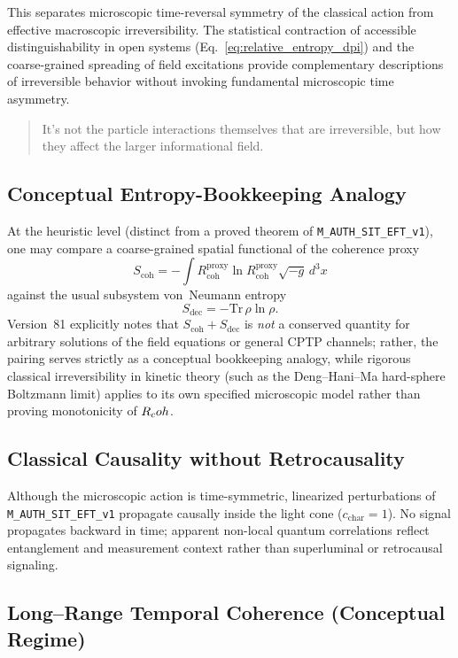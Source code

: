 This separates microscopic time-reversal symmetry of the classical action from effective macroscopic irreversibility. The statistical contraction of accessible distinguishability in open systems (Eq.~\eqref{eq:relative_entropy_dpi}) and the coarse-grained spreading of field excitations provide complementary descriptions of irreversible behavior without invoking fundamental microscopic time asymmetry.

\blockquote{
It's not the particle interactions themselves that are irreversible, but how they affect the larger informational field.
}

\subsection{Conceptual Entropy-Bookkeeping Analogy}

At the heuristic level (distinct from a proved theorem of \texttt{M\_AUTH\_SIT\_EFT\_v1}), one may compare a coarse-grained spatial functional of the coherence proxy
\[
S_{\mathrm{coh}} = -\int R_{\mathrm{coh}}^{\mathrm{proxy}}\ln R_{\mathrm{coh}}^{\mathrm{proxy}}\sqrt{-g}\,d^{3}x
\]
against the usual subsystem von~Neumann entropy
\[
S_{\mathrm{dec}} = -\mathrm{Tr}\,\rho\ln\rho.
\]
Version~81 explicitly notes that $S_{\mathrm{coh}} + S_{\mathrm{dec}}$ is \emph{not} a conserved quantity for arbitrary solutions of the field equations or general CPTP channels; rather, the pairing serves strictly as a conceptual bookkeeping analogy, while rigorous classical irreversibility in kinetic theory (such as the Deng--Hani--Ma hard-sphere Boltzmann limit) applies to its own specified microscopic model rather than proving monotonicity of $R_coh$.

\subsection{Classical Causality without Retrocausality}

Although the microscopic action is time-symmetric, linearized perturbations of \texttt{M\_AUTH\_SIT\_EFT\_v1} propagate causally inside the light cone ($c_{\mathrm{char}} = 1$). No signal propagates backward in time; apparent non-local quantum correlations reflect entanglement and measurement context rather than superluminal or retrocausal signaling.

\subsection{Long--Range Temporal Coherence (Conceptual Regime)}

